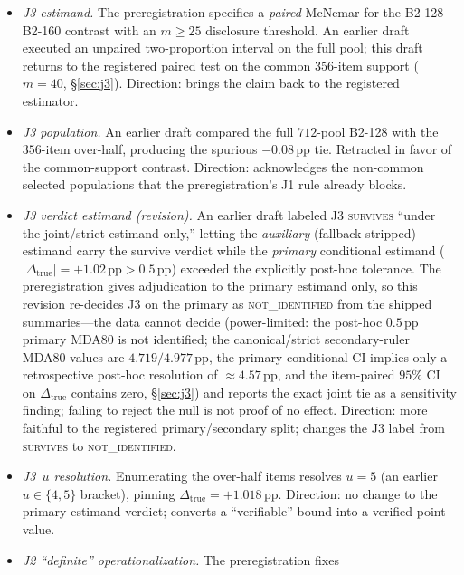 \documentclass{article}
\newcommand{\pp}{\,\mathrm{pp}}
\newcommand{\good}{\textsc{survives}}
\begin{document}
\begin{itemize}
  \item \emph{J3 estimand.}  The preregistration specifies a \emph{paired}
        McNemar for the B2-128--B2-160 contrast with an $m\geq25$ disclosure
        threshold.  An earlier draft executed an unpaired two-proportion
        interval on the full pool; this draft returns to the registered paired
        test on the common $356$-item support ($m{=}40$, \S\ref{sec:j3}).
        Direction: brings the claim back to the registered estimator.
  \item \emph{J3 population.}  An earlier draft compared the full $712$-pool
        B2-128 with the $356$-item over-half, producing the spurious
        $-0.08\pp$ tie.  Retracted in favor of the common-support contrast.
        Direction: acknowledges the non-common selected populations that the
        preregistration's J1 rule already blocks.
  \item \emph{J3 verdict estimand (revision).}  An earlier draft labeled J3
        \good{} ``under the joint/strict estimand only,'' letting the
        \emph{auxiliary} (fallback-stripped) estimand carry the survive verdict
        while the \emph{primary} conditional estimand ($|\Delta_{\mathrm{true}}|
        {=}+1.02\pp > 0.5\pp$) exceeded the explicitly post-hoc tolerance.  The preregistration gives
        adjudication to the primary estimand only, so this revision re-decides
        J3 on the primary as \textsc{not\_identified} from the shipped
        summaries---the data cannot decide (power-limited: the post-hoc $0.5\pp$
        primary MDA80 is not identified; the canonical/strict secondary-ruler
        MDA80 values are $4.719/4.977\pp$, the primary conditional CI implies
        only a retrospective post-hoc resolution of $\approx4.57\pp$, and the item-paired $95\%$
        CI on $\Delta_{\mathrm{true}}$ contains zero, \S\ref{sec:j3}) and
        reports the exact joint tie as a sensitivity finding; failing to reject
        the null is not proof of no effect.  Direction: more
        faithful to the registered primary/secondary split; changes the J3 label
        from \good{} to \textsc{not\_identified}.
  \item \emph{J3~$u$ resolution.}  Enumerating the over-half items resolves
        $u{=}5$ (an earlier $u\in\{4,5\}$ bracket), pinning
        $\Delta_{\mathrm{true}}{=}+1.018\pp$.  Direction: no change to the
        primary-estimand verdict; converts a ``verifiable'' bound into a
        verified point value.
  \item \emph{J2 ``definite'' operationalization.}  The preregistration fixes

\end{itemize}
\end{document}
